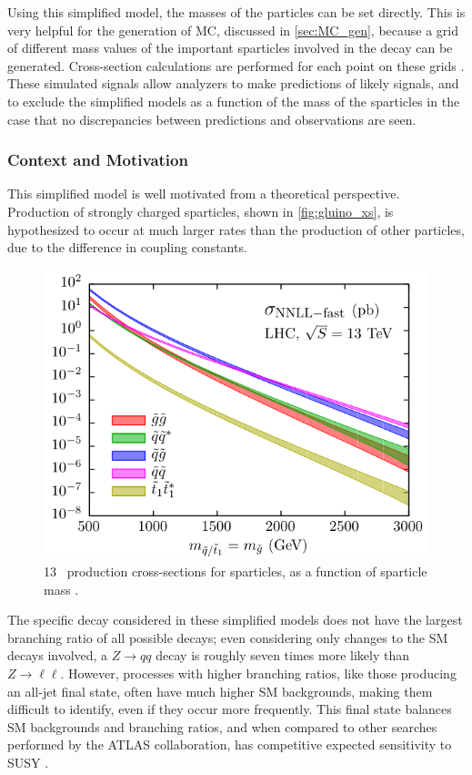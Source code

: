 Using this simplified model, the masses of the particles can be set directly. This is very helpful for the generation of \acf{MC}, discussed in \autoref{sec:MC_gen}, because a grid of different mass values of the important sparticles involved in the decay can be generated. Cross-section calculations are performed for each point on these grids \cite{1105.1110}.  These simulated signals allow analyzers to make predictions of likely signals, and to exclude the simplified models as a function of the mass of the sparticles in the case that no discrepancies between predictions and observations are seen. 


\subsubsection{Context and Motivation}

This simplified model is well motivated from a theoretical perspective. Production of strongly charged sparticles, shown in \autoref{fig:gluino_xs}, is hypothesized to occur at much larger rates than the production of other particles, due to the difference in coupling constants. 

\begin{centering}
\begin{figure}[!hbt]
\myfloatalign
\includegraphics[width=.9\linewidth]{figures/theory/nnllfast_wpresc_total.pdf}
\caption{ 13 \tev~production cross-sections for sparticles, as a function of sparticle mass \cite{1607.07741}.}
\label{fig:gluino_xs}
\end{figure}
\end{centering}

The specific decay considered in these simplified models does not have the largest branching ratio of all possible decays; even considering only changes to the \ac{SM} decays involved, a $Z\rightarrow qq$ decay is roughly seven times more likely than $Z\rightarrow\ell\ell$. However, processes with higher branching ratios, like those producing an all-jet final state, often have much higher \ac{SM} backgrounds, making them difficult to identify, even if they occur more frequently. This final state balances \ac{SM} backgrounds and branching ratios, and when compared to other searches performed by the \ac{ATLAS} collaboration, has competitive expected sensitivity to \ac{SUSY} \cite{summary_plot}. 

